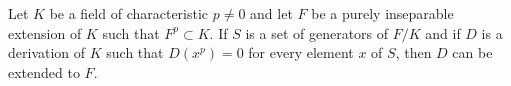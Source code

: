 Let $K$ be a field of characteristic $p \neq 0$ and let $F$ be a purely inseparable extension of $K$ such that $F^p \subset K$. If $S$ is a set of generators of $F/K$ and if $D$ is a derivation of $K$ such that $D(x^p) = 0$ for every element $x$ of $S$, then $D$ can be extended to $F$.
